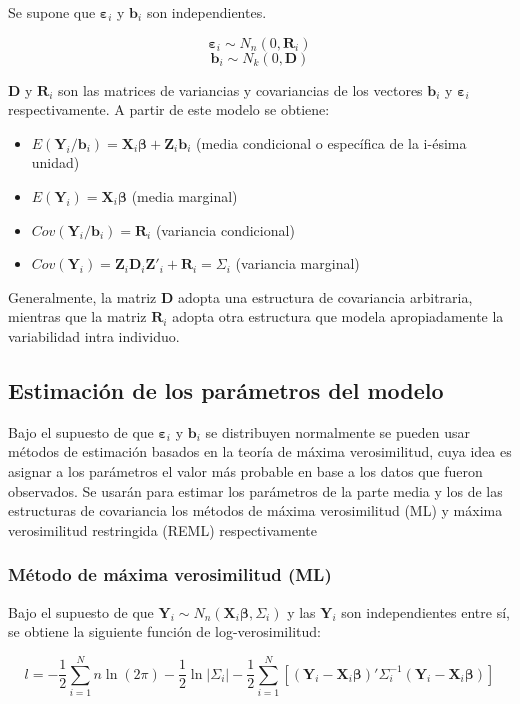 \documentclass[spanish]{article}
\numberwithin{figure}{subsection}
\numberwithin{equation}{subsection}
\numberwithin{table}{subsection}
\begin{document}
Se supone que $\bm{\varepsilon}_i$ y $\bm{b}_i$ son independientes.

\[ \bm{\varepsilon}_i \sim N_{n}(0, \bm{R}_i) \]
\[ \bm{b}_i \sim N_k(0, \bm{D}) \]

$\bm{D}$ y $\bm{R}_i$ son las matrices de variancias y covariancias de los
vectores $\bm{b}_i$ y $\bm{\varepsilon}_i$ respectivamente. A partir de este
modelo se obtiene:

\begin{itemize}
	\item $E(\bm{Y}_i/\bm{b}_i) = \bm{X}_i\bm{\beta} + \bm{Z}_i\bm{b}_i$ (media condicional o específica de
	la i-ésima unidad)
	\item $E(\bm{Y}_i) = \bm{X}_i\bm{\beta}$ (media marginal)
	\item $Cov(\bm{Y}_i/\bm{b}_i) = \bm{R}_i$ (variancia condicional)
	\item $Cov(\bm{Y}_i) = \bm{Z}_i \bm{D}_i \bm{Z}'_i + \bm{R}_i = \bm{\varSigma}_i$ (variancia marginal)
\end{itemize}

Generalmente, la matriz $\bm{D}$ adopta una estructura de covariancia
arbitraria, mientras que la matriz $\bm{R}_i$ adopta otra estructura que modela
apropiadamente la variabilidad intra individuo.

\subsection{Estimación de los parámetros del modelo}

Bajo el supuesto de que $\bm{\varepsilon}_i$ y $\bm{b}_i$ se distribuyen normalmente se
pueden usar métodos de estimación basados en la teoría de máxima verosimilitud,
cuya idea es asignar a los parámetros el valor más probable en base a los datos
que fueron observados. Se usarán para estimar los parámetros de la parte media
y los de las estructuras de covariancia los métodos de máxima verosimilitud
(ML) y máxima verosimilitud restringida (REML) respectivamente

\subsubsection{Método de máxima verosimilitud (ML)}

Bajo el supuesto de que $\bm{Y}_i \sim N_n(\bm{X}_i \bm{\beta},
\bm{\varSigma}_i)$ y las $\bm{Y}_i$
son independientes entre sí, se obtiene la siguiente función de
log-verosimilitud:

\begin{equation}
\label{ML}
	l = -\frac{1}{2} \sum_{i=1}^{N}n \ln(2\pi) - \frac{1}{2}\ln|\bm{\varSigma}_i| -
	\frac{1}{2} \sum_{i=1}^{N} [(\bm{Y}_i - \bm{X}_i\bm{\beta})'
	\bm{\varSigma}_i^{-1} (\bm{Y}_i - \bm{X}_i\bm{\beta})]
\end{equation}
\end{document}
